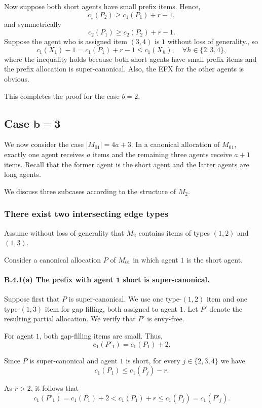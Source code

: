 \documentclass{article}
\theoremstyle{definition}
\begin{document}
Now suppose both short agents have small prefix items. Hence,
\[
    c_1(P_2)\ge c_1(P_1)+r-1,
\]
and symmetrically
\[
    c_2(P_1)\ge c_2(P_2)+r-1.
\]
Suppose the agent who is assigned item $(3,4)$ is $1$ without loss of generality., so 
\[
    c_1(X_1) - 1 =  c_1(P_1)+r-1 \le c_1(X_h), \quad \forall h \in \{2,3,4\},
\]
where the inequality holds because both short agents have small prefix items and the prefix allocation is super-canonical. Also, the EFX for the other agents is obvious.

This completes the proof for the case $b=2$.


\subsection{Case $\boldsymbol{b=3}$}

We now consider the case $|M_{01}|=4a+3$.  In a canonical allocation of
$M_{01}$, exactly one agent receives $a$ items and the remaining three agents
receive $a+1$ items.  Recall that the former agent is the short agent and the latter agents are long agents.

We discuss three subcases according to the structure of $M_2$.

\subsubsection{There exist two intersecting edge types}

Assume without loss of generality that $M_2$ contains items of types $(1,2)$
and $(1,3)$.

Consider a canonical allocation $P$ of $M_{01}$ in which agent $1$ is the
short agent.
\paragraph{B.4.1(a) The prefix with agent $\boldsymbol{1}$ short is super-canonical.}
Suppose first that $P$ is super-canonical.  We use one type-$(1,2)$ item and
one type-$(1,3)$ item for gap filling, both assigned to agent $1$.  Let $P'$
denote the resulting partial allocation.  We verify that $P'$ is envy-free.

For agent $1$, both gap-filling items are small.  Thus,
\[
    c_1(P'_1)=c_1(P_1)+2.
\]

Since $P$ is super-canonical and agent $1$ is short, for every
$j\in\{2,3,4\}$ we have
\[
    c_1(P_1)\le c_1(P_j)-r.
\]

As $r>2$, it follows that
\[
    c_1(P'_1)=c_1(P_1)+2 < c_1(P_1)+r \le c_1(P_j)=c_1(P'_j).
\]
\end{document}
